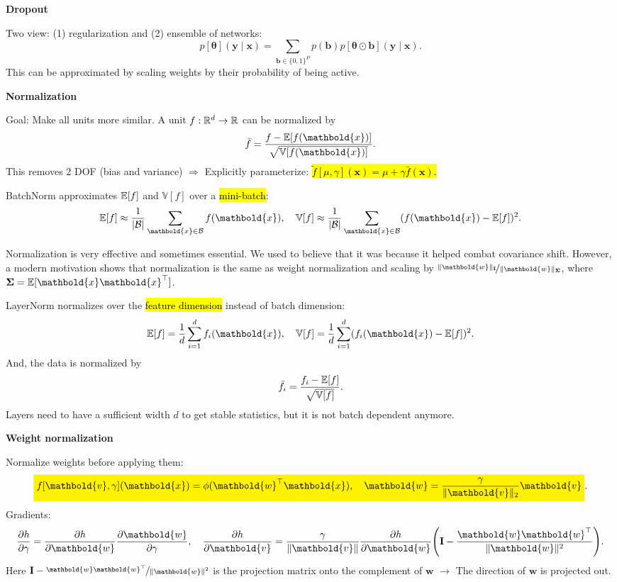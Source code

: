\documentclass[10pt]{article}
\newenvironment{topic}[1]
{\textbf{\sffamily \footnotesize \colorbox{black}{\rlap{\textbf{\textcolor{white}{#1}}}\hspace{\linewidth}\hspace{-2\fboxsep}}}}
{}
\newenvironment{subtopic}[1]
{\begin{center}\textbf{\footnotesize \sffamily #1}\end{center}}
{}
\renewcommand{\mat}[1]{\ensuremath{\mathbf{#1}}}
\renewcommand{\vec}[1]{\ensuremath{\mathbold{#1}}}
\renewcommand{\Var}{\mathbb{V}}
\begin{document}
\begin{multicols*}{3}
\begin{topic}{Tricks of the trade}
\begin{subtopic}{Dropout}
            Two view: (1) regularization and (2) ensemble of networks: \[
                p[\vec{\theta}](\vec{y} \mid \vec{x}) = \sum_{\vec{b} \in \{ 0,1 \}^P} p(\vec{b}) p[\vec{\theta} \odot \vec{b}](\vec{y} \mid \vec{x}).
            \]
            This can be approximated by scaling weights by their probability of being active.
        \end{subtopic}

        \begin{subtopic}{Normalization}
            Goal: Make all units more similar. A unit $f: \mathbb{R}^d \to \mathbb{R}$ can be normalized by \[
                \bar{f} = \frac{f - \E[f(\vec{x})]}{\sqrt{\Var[f(\vec{x})]}}.
            \]
            This removes 2 DOF (bias and variance) $\Rightarrow$ Explicitly parameterize: \hl{$\tilde{f}[\mu,\gamma](\vec{x}) = \mu + \gamma \bar{f}(\vec{x})$.}

            BatchNorm approximates $\mathbb{E}[f]$ and $\Var[f]$ over a \hl{mini-batch}: \[
                \E[f] \approx \frac{1}{|\mathcal{B}|} \sum_{\vec{x} \in \mathcal{B}} f(\vec{x}), \quad \Var[f] \approx \frac{1}{|\mathcal{B}|} \sum_{\vec{x} \in \mathcal{B}} (f(\vec{x}) - \E[f])^2.
            \]

            Normalization is very effective and sometimes essential. We used to believe that it was because it
            helped combat covariance shift. However, a modern motivation shows that normalization is the same
            as weight normalization and scaling by $\nicefrac{\| \vec{w} \|_{\mat{I}}}{\| \vec{w}
                \|_{\mat{\Sigma}}}$, where $\mat{\Sigma} = \E[\vec{x}\transpose{\vec{x}}]$.

            LayerNorm normalizes over the \hl{feature dimension} instead of batch dimension: \[
                \E[f] = \frac{1}{d} \sum_{i=1}^{d} f_i(\vec{x}), \quad \Var[f] = \frac{1}{d} \sum_{i=1}^{d} (f_i(\vec{x}) - \E[f])^2.
            \]
            And, the data is normalized by \[
                \bar{f}_i = \frac{f_i - \E[f]}{\sqrt{\Var[f]}}.
            \]
            Layers need to have a sufficient width $d$ to get stable statistics, but it is not batch
            dependent anymore.
        \end{subtopic}

        \begin{subtopic}{Weight normalization}
            Normalize weights before applying them: \[
                \colorbox{yellow}{$\displaystyle f[\vec{v},\gamma](\vec{x}) = \phi(\transpose{\vec{w}}\vec{x}), \quad \vec{w} = \frac{\gamma}{\| \vec{v} \|_2} \vec{v}$}.
            \]
            Gradients: \[
                \pdv{h}{\gamma} = \pdv{h}{\vec{w}} \pdv{\vec{w}}{\gamma}, \quad \pdv{h}{\vec{v}} = \frac{\gamma}{\| \vec{v} \|} \pdv{h}{\vec{w}} \lft( \mat{I} - \frac{\vec{w}\transpose{\vec{w}}}{\| \vec{w} \|^2} \rgt).
            \]
            Here $\mat{I} - \nicefrac{\vec{w}\transpose{\vec{w}}}{\| \vec{w} \|^2}$ is the projection matrix
            onto the complement of $\vec{w}$ $\to$ The direction of $\vec{w}$ is projected out.
        \end{subtopic}


\end{topic}
\end{multicols*}
\end{document}
